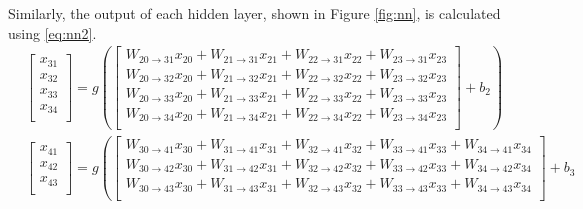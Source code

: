 \noindent Similarly, the output of each hidden layer, shown in Figure \ref{fig:nn}, is calculated using \ref{eq:nn2}.
%
\begin{equation}
  \label{eq:nn2}
  \begin{split}
    &
    \left[
    \begin{matrix}
      x_{31} \\
      x_{32} \\
      x_{33} \\
      x_{34} \\
    \end{matrix}
    \right] = g
    \left(
    \left[
    \begin{matrix}
      W_{20 \rightarrow 31} x_{20} + W_{21 \rightarrow 31} x_{21} + W_{22 \rightarrow 31} x_{22} + W_{23 \rightarrow 31} x_{23} \\
      W_{20 \rightarrow 32} x_{20} + W_{21 \rightarrow 32} x_{21} + W_{22 \rightarrow 32} x_{22} + W_{23 \rightarrow 32} x_{23} \\
      W_{20 \rightarrow 33} x_{20} + W_{21 \rightarrow 33} x_{21} + W_{22 \rightarrow 33} x_{22} + W_{23 \rightarrow 33} x_{23} \\
      W_{20 \rightarrow 34} x_{20} + W_{21 \rightarrow 34} x_{21} + W_{22 \rightarrow 34} x_{22} + W_{23 \rightarrow 34} x_{23} \\
    \end{matrix}
    \right] + b_{2}
    \right) \\
    &
    \left[
    \begin{matrix}
      x_{41} \\
      x_{42} \\
      x_{43} \\
    \end{matrix}
    \right] = g
    \left(
    \left[
    \begin{matrix}
      W_{30 \rightarrow 41} x_{30} + W_{31 \rightarrow 41} x_{31} + W_{32 \rightarrow 41} x_{32} + W_{33 \rightarrow 41} x_{33} + W_{34 \rightarrow 41} x_{34} \\
      W_{30 \rightarrow 42} x_{30} + W_{31 \rightarrow 42} x_{31} + W_{32 \rightarrow 42} x_{32} + W_{33 \rightarrow 42} x_{33} + W_{34 \rightarrow 42} x_{34} \\
      W_{30 \rightarrow 43} x_{30} + W_{31 \rightarrow 43} x_{31} + W_{32 \rightarrow 43} x_{32} + W_{33 \rightarrow 43} x_{33} + W_{34 \rightarrow 43} x_{34} \\
    \end{matrix}
    \right] + b_{3}

\end{split}
\end{equation}
